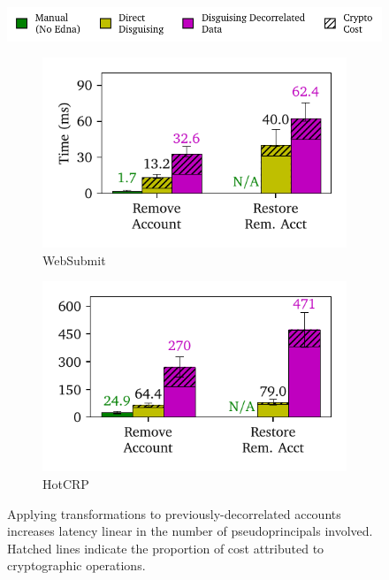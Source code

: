 \begin{figure}[h]
    \centering
    \includegraphics[width=.8\columnwidth]{figs/composition_legend}
    \begin{subfigure}[b]{.48\columnwidth}
        \includegraphics[width=\columnwidth]{figs/composition_stats_websubmit}
        \caption{WebSubmit}
        \label{f:comp-websubmit}
      \end{subfigure}
      \begin{subfigure}[b]{.48\columnwidth}
          \includegraphics[width=\columnwidth]{figs/composition_stats_hotcrp}
          \caption{HotCRP}
        \label{f:comp-hotcrp}
      \end{subfigure}
    \caption[Composing disguising transformations increases latency of
    disguise and reveal linear in the number of involved
    pseudoprincipals.]{Applying \xxing transformations to previously-decorrelated accounts
      increases latency linear in the number of pseudoprincipals involved.
      Hatched lines indicate the proportion of cost attributed to
      cryptographic operations.}
    \label{f:composition}
\end{figure}


